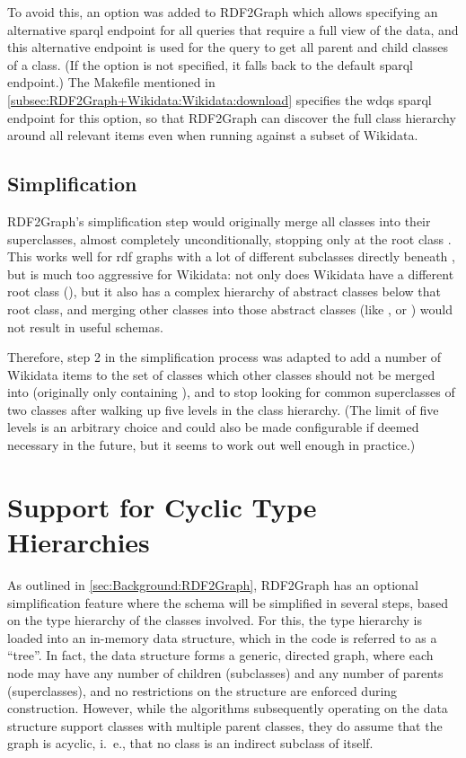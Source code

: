 To avoid this, an option was added to \gls{RDF2Graph}
which allows specifying an alternative \gls{sparql} endpoint
for all queries that require a full view of the data,
and this alternative endpoint is used for the query to get all parent and child classes of a class.
(If the option is not specified, it falls back to the default \gls{sparql} endpoint.)
The Makefile mentioned in \cref{subsec:RDF2Graph+Wikidata:Wikidata:download}
specifies the \gls{wdqs} \gls{sparql} endpoint for this option,
so that \gls{RDF2Graph} can discover the full class hierarchy around all relevant items
even when running against a subset of \gls{Wikidata}.

\subsection{Simplification}
\label{subsec:RDF2Graph+Wikidata:Wikidata:simplification}

\Gls{RDF2Graph}’s simplification step would originally merge all classes into their superclasses,
almost completely unconditionally,
stopping only at the root class .
This works well for \gls{rdf} graphs with a lot of different subclasses directly beneath ,
but is much too aggressive for \gls{Wikidata}:
not only does \gls{Wikidata} have a different root class (),
but it also has a complex hierarchy of abstract classes below that root class,
and merging other classes into those abstract classes
(like ,  or )
would not result in useful \glspl{schema}.

Therefore, step 2 in the simplification process was adapted
to add a number of \gls{Wikidata} \glspl{item} to the set of classes
which other classes should not be merged into
(originally only containing ),
and to stop looking for common superclasses of two classes
after walking up five levels in the class hierarchy.
(The limit of five levels is an arbitrary choice
and could also be made configurable if deemed necessary in the future,
but it seems to work out well enough in practice.)

\section{Support for Cyclic Type Hierarchies}
\label{sec:RDF2Graph+Wikidata:cyclic-graphs}

As outlined in \cref{sec:Background:RDF2Graph},
\gls{RDF2Graph} has an optional simplification feature
where the \gls{schema} will be simplified in several steps,
based on the type hierarchy of the classes involved.
For this, the type hierarchy is loaded into an in-memory data structure,
which in the code is referred to as a “tree”.
In fact, the data structure forms a generic, directed graph,
where each node may have any number of children (subclasses) and any number of parents (superclasses),
and no restrictions on the structure are enforced during construction.
However, while the algorithms subsequently operating on the data structure support classes with multiple parent classes,
they do assume that the graph is acyclic,
i.~e., that no class is an indirect subclass of itself.


